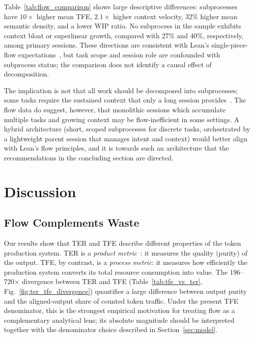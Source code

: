 \documentclass[journal]{IEEEtran}
\begin{document}
Table~\ref{tab:flow_comparison} shows large descriptive differences: subprocesses have $10\times$ higher mean TFE, $2.1\times$ higher context velocity, 32\% higher mean semantic density, and a lower WIP ratio. No subprocess in the sample exhibits context bloat or superlinear growth, compared with 27\% and 40\%, respectively, among primary sessions. These directions are consistent with Lean's single-piece-flow expectations~\cite{reinertsen2009, poppendieck2003}, but task scope and session role are confounded with subprocess status; the comparison does not identify a causal effect of decomposition.

The implication is not that all work should be decomposed into subprocesses; some tasks require the sustained context that only a long session provides~\cite{barke2023}. The flow data do suggest, however, that monolithic sessions which accumulate multiple tasks and growing context may be flow-inefficient in some settings. A hybrid architecture (short, scoped subprocesses for discrete tasks, orchestrated by a lightweight parent session that manages intent and context) would better align with Lean's flow principles, and it is towards such an architecture that the recommendations in the concluding section are directed.

\section{Discussion}
\label{sec:discussion}

\subsection{Flow Complements Waste}

Our results show that TER and TFE describe different properties of the token production system. TER is a \emph{product metric}~\cite{fenton2014}: it measures the quality (purity) of the output. TFE, by contrast, is a \emph{process metric}: it measures how efficiently the production system converts its total resource consumption into value. The 196--720$\times$ divergence between TER and TFE (Table~\ref{tab:tfe_vs_ter}, Fig.~\ref{fig:ter_tfe_divergence}) quantifies a large difference between output purity and the aligned-output share of counted token traffic. Under the present TFE denominator, this is the strongest empirical motivation for treating flow as a complementary analytical lens; its absolute magnitude should be interpreted together with the denominator choice described in Section~\ref{sec:model}.
\end{document}
